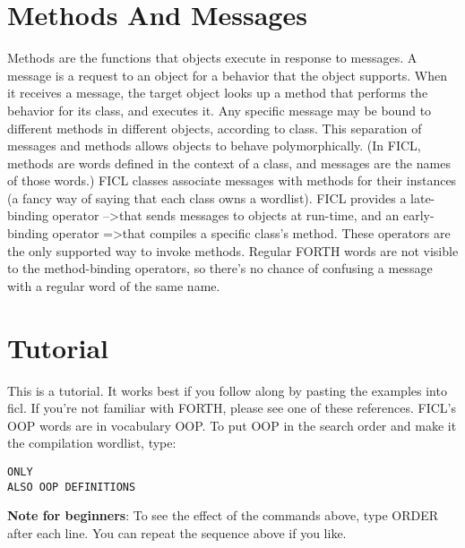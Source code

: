 \section{Methods And Messages}
Methods are the functions that objects execute in response to messages.
A message is a request to an object for a behavior that the object
supports. When it receives a message, the target object looks up a
method that performs the behavior for its class, and executes it. Any
specific message may be bound to different methods in different objects,
according to class. This separation of messages and methods allows
objects to behave polymorphically. (In FICL, methods are words defined
in the context of a class, and messages are the names of those words.)
FICL classes associate messages with methods for their instances (a
fancy way of saying that each class owns a wordlist). FICL provides a
late-binding operator --\textgreater  that sends messages to objects at
run-time, and an early-binding operator =\textgreater  that compiles a
specific class's method. These operators are the only supported way to
invoke methods. Regular FORTH words are not visible to the
method-binding operators, so there's no chance of confusing a message
with a regular word of the same name.


\section{Tutorial}
This is a tutorial. It works best if you follow along by pasting the
examples into ficl. If you're not familiar with FORTH, please see one
of these references. FICL's OOP words are in vocabulary OOP. To put OOP
in the search order and make it the compilation wordlist, type:
\begin{lstlisting}[frame=single]
ONLY
ALSO OOP DEFINITIONS
\end{lstlisting}
\textbf{Note for beginners}: To see the effect of the commands above,
type ORDER after each line. You can repeat the sequence above if you
like.

